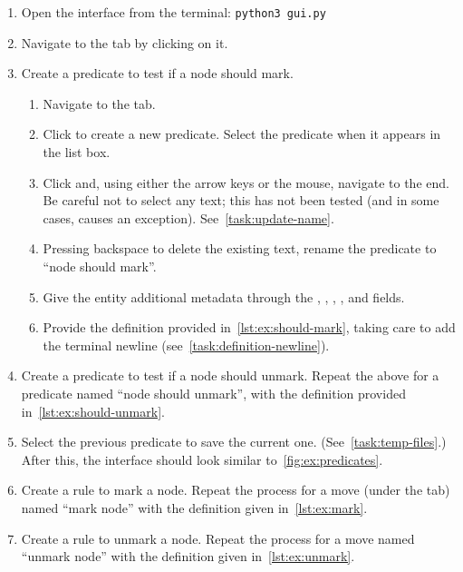 \begin{enumerate}
\newcommand\bash[1]{\texttt{#1}}%
\item Open the interface from the terminal: \bash{python3 gui.py}
\item Navigate to the  tab by clicking on it.
\item Create a predicate to test if a node should mark.
  \begin{enumerate}
  \item Navigate to the  tab.
  \item Click  to create a new predicate.
    Select the predicate when it appears in the list box.
  \item Click  and, using either the arrow keys or the mouse, navigate to the end.
    Be careful not to select any text; this has not been tested (and in some cases, causes an exception).
    See~\autoref{task:update-name}.
  \item Pressing backspace \keys{\backspace} to delete the existing text,
    rename the predicate to \enquote{node should mark}.
  \item Give the entity additional metadata through the
    ,
    ,
    ,
    , and
     fields.
  \item Provide the definition provided in~\autoref{lst:ex:should-mark},
    taking care to add the terminal newline (see~\autoref{task:definition-newline}).
  \end{enumerate}
\item Create a predicate to test if a node should unmark.  Repeat the
  above for a predicate named \enquote{node should unmark}, with the
  definition provided in~\autoref{lst:ex:should-unmark}.
\item Select the previous predicate to save the current one.
  (See~\autoref{task:temp-files}.)
  After this, the interface should look similar to~\autoref{fig:ex:predicates}.
\item Create a rule to mark a node.
  Repeat the process for a move (under the  tab)
    named \enquote{mark node} with the definition given in~\autoref{lst:ex:mark}.
\item Create a rule to unmark a node.
  Repeat the process for a move
    named \enquote{unmark node} with the definition given in~\autoref{lst:ex:unmark}.

\end{enumerate}
